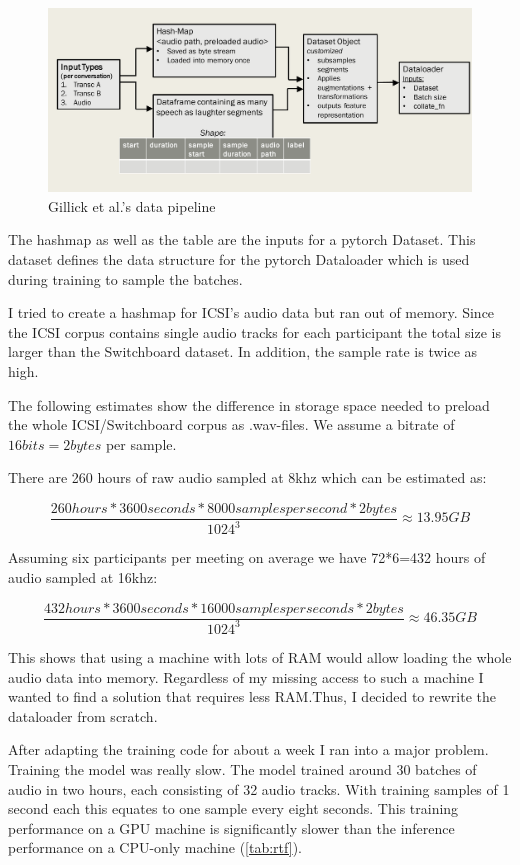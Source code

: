 \documentclass[bsc,frontabs,parskip,deptreport]{infthesis}
\begin{document}
\begin{figure}
    \centering
    \includegraphics[width=14cm]{imgs/diagrams/Gillick_et_al_data_pipeline.png}
    \caption{Gillick et al.'s data pipeline}
    \label{fig:gillick-data-pipeline}
\end{figure}

The hashmap as well as the table are the inputs for a pytorch Dataset. This dataset defines the data structure for the pytorch Dataloader which is used during training to sample the batches.

I tried to create a hashmap for ICSI's audio data but ran out of memory. Since the ICSI corpus contains single audio tracks for each participant the total size is larger than the Switchboard dataset. In addition, the sample rate is twice as high.

The following estimates show the difference in storage space needed to preload the whole ICSI/Switchboard corpus as .wav-files. We assume a bitrate of $16bits=2bytes$ per sample.

There are 260 hours of raw audio sampled at 8khz which can be estimated as:

\[ \frac{260hours * 3600 seconds * 8000 samples per second * 2 bytes}{1024^3} \approx 13.95 GB \]

Assuming six participants per meeting on average we have 72*6=432 hours of audio sampled at 16khz:

\[ \frac{432 hours * 3600 seconds * 16000 samples per seconds * 2bytes}{1024^3} \approx 46.35 GB \]

This shows that using a machine with lots of RAM would allow loading the whole audio data into memory. 
Regardless of my missing access to such a machine I wanted to find a solution that requires less RAM.Thus, I decided to rewrite the dataloader from scratch. 

After adapting the training code for about a week I ran into a major problem. Training the model was really slow. The model trained around 30 batches of audio in two hours, each consisting of 32 audio tracks. 
With training samples of 1 second each this equates to one sample every eight seconds.
This training performance on a GPU machine is significantly slower than the inference performance on a CPU-only machine (\autoref{tab:rtf}).
\end{document}
